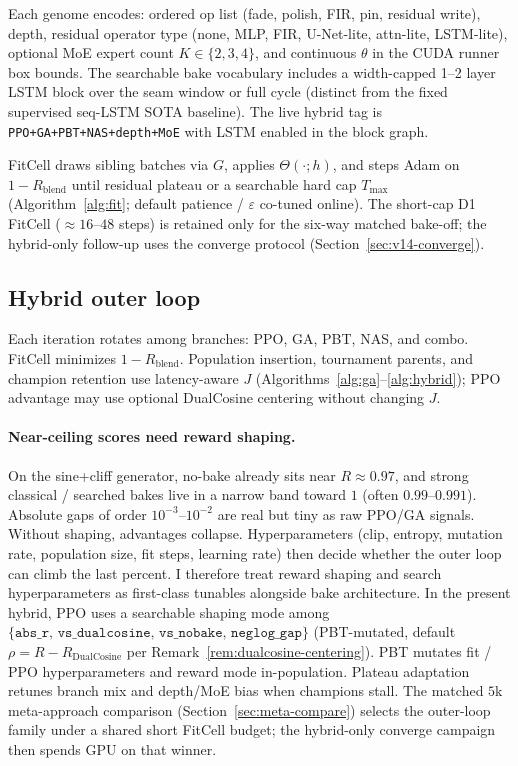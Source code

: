 Each genome encodes: ordered op list (fade, polish, FIR, pin, residual write), depth, residual operator type (none, MLP, FIR, U-Net-lite, attn-lite, LSTM-lite), optional MoE expert count $K\in\{2,3,4\}$, and continuous $\theta$ in the CUDA runner box bounds.
The searchable bake vocabulary includes a width-capped 1--2 layer LSTM block over the seam window or full cycle (distinct from the fixed supervised seq-LSTM SOTA baseline).
The live hybrid tag is \texttt{PPO+GA+PBT+NAS+depth+MoE} with LSTM enabled in the block graph.

FitCell draws sibling batches via $G$, applies $\Theta(\cdot;h)$, and steps Adam on $1-R_{\mathrm{blend}}$ until residual plateau or a searchable hard cap $T_{\max}$ (Algorithm~\ref{alg:fit}; default patience / $\varepsilon$ co-tuned online).
The short-cap D1 FitCell (${\approx}16$--$48$ steps) is retained only for the six-way matched bake-off; the hybrid-only follow-up uses the converge protocol (Section~\ref{sec:v14-converge}).

\subsection{Hybrid outer loop}
\label{sec:hybrid}

Each iteration rotates among branches: PPO, GA, PBT, NAS, and combo.
FitCell minimizes $1-R_{\mathrm{blend}}$.
Population insertion, tournament parents, and champion retention use latency-aware $J$ (Algorithms~\ref{alg:ga}--\ref{alg:hybrid}); PPO advantage may use optional DualCosine centering without changing $J$.

\paragraph{Near-ceiling scores need reward shaping.}
\label{sec:reward-shaping}
On the sine{+}cliff generator, no-bake already sits near $R\approx 0.97$, and strong classical / searched bakes live in a narrow band toward $1$ (often $0.99$--$0.991$).
Absolute gaps of order $10^{-3}$--$10^{-2}$ are real but tiny as raw PPO/GA signals.
Without shaping, advantages collapse.
Hyperparameters (clip, entropy, mutation rate, population size, fit steps, learning rate) then decide whether the outer loop can climb the last percent.
I therefore treat reward shaping and search hyperparameters as first-class tunables alongside bake architecture.
In the present hybrid, PPO uses a searchable shaping mode among $\{\texttt{abs\_r},\,\texttt{vs\_dualcosine},\,\texttt{vs\_nobake},\,\texttt{neglog\_gap}\}$ (PBT-mutated, default $\rho = R - R_{\mathrm{DualCosine}}$ per Remark~\ref{rem:dualcosine-centering}).
PBT mutates fit / PPO hyperparameters and reward mode in-population. Plateau adaptation retunes branch mix and depth/MoE bias when champions stall.
The matched $5$k meta-approach comparison (Section~\ref{sec:meta-compare}) selects the outer-loop family under a shared short FitCell budget; the hybrid-only converge campaign then spends GPU on that winner.

